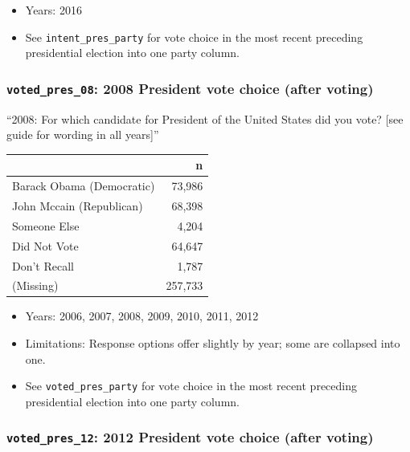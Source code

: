 \documentclass[10pt,article,oneside]{memoir}
\theoremstyle{definition}
\begin{document}
\begin{itemize}
\tightlist
\item
  Years: 2016
\item
  See \texttt{intent\_pres\_party} for vote choice in the most recent
  preceding presidential election into one party column.
\end{itemize}

\hypertarget{voted_pres_08-2008-president-vote-choice-after-voting}{%
\subsubsection{\texorpdfstring{\texttt{voted\_pres\_08}: 2008 President
vote choice (after
voting)}{voted\_pres\_08: 2008 President vote choice (after voting)}}\label{voted_pres_08-2008-president-vote-choice-after-voting}}

``2008: For which candidate for President of the United States did you
vote? {[}see guide for wording in all years{]}''

\begin{table}[H]
\centering
\begin{tabular}{lr}
\toprule
 & n\\
\midrule
Barack Obama (Democratic) & 73,986\\
John Mccain (Republican) & 68,398\\
Someone Else & 4,204\\
Did Not Vote & 64,647\\
Don't Recall & 1,787\\
(Missing) & 257,733\\
\bottomrule
\end{tabular}
\end{table}

\begin{itemize}
\tightlist
\item
  Years: 2006, 2007, 2008, 2009, 2010, 2011, 2012
\item
  Limitations: Response options offer slightly by year; some are
  collapsed into one.
\item
  See \texttt{voted\_pres\_party} for vote choice in the most recent
  preceding presidential election into one party column.
\end{itemize}

\hypertarget{voted_pres_12-2012-president-vote-choice-after-voting}{%
\subsubsection{\texorpdfstring{\texttt{voted\_pres\_12}: 2012 President
vote choice (after
voting)}{voted\_pres\_12: 2012 President vote choice (after voting)}}\label{voted_pres_12-2012-president-vote-choice-after-voting}}
\end{document}
